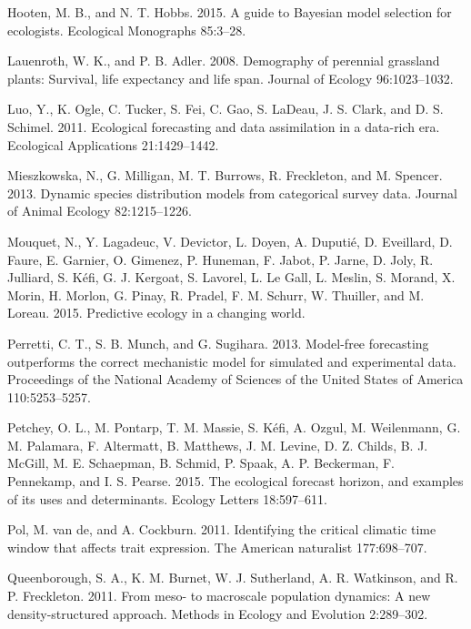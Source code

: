 \documentclass[12pt,]{article}
\begin{document}
\hypertarget{ref-Hooten2015}{}
Hooten, M. B., and N. T. Hobbs. 2015. A guide to Bayesian model
selection for ecologists. Ecological Monographs 85:3--28.

\hypertarget{ref-Lauenroth2008}{}
Lauenroth, W. K., and P. B. Adler. 2008. Demography of perennial
grassland plants: Survival, life expectancy and life span. Journal of
Ecology 96:1023--1032.

\hypertarget{ref-Luo2011a}{}
Luo, Y., K. Ogle, C. Tucker, S. Fei, C. Gao, S. LaDeau, J. S. Clark, and
D. S. Schimel. 2011. Ecological forecasting and data assimilation in a
data-rich era. Ecological Applications 21:1429--1442.

\hypertarget{ref-Mieszkowska2013}{}
Mieszkowska, N., G. Milligan, M. T. Burrows, R. Freckleton, and M.
Spencer. 2013. Dynamic species distribution models from categorical
survey data. Journal of Animal Ecology 82:1215--1226.

\hypertarget{ref-Mouquet2015}{}
Mouquet, N., Y. Lagadeuc, V. Devictor, L. Doyen, A. Duputié, D.
Eveillard, D. Faure, E. Garnier, O. Gimenez, P. Huneman, F. Jabot, P.
Jarne, D. Joly, R. Julliard, S. Kéfi, G. J. Kergoat, S. Lavorel, L. Le
Gall, L. Meslin, S. Morand, X. Morin, H. Morlon, G. Pinay, R. Pradel, F.
M. Schurr, W. Thuiller, and M. Loreau. 2015. Predictive ecology in a
changing world.

\hypertarget{ref-Perretti2013a}{}
Perretti, C. T., S. B. Munch, and G. Sugihara. 2013. Model-free
forecasting outperforms the correct mechanistic model for simulated and
experimental data. Proceedings of the National Academy of Sciences of
the United States of America 110:5253--5257.

\hypertarget{ref-Petchey2015}{}
Petchey, O. L., M. Pontarp, T. M. Massie, S. Kéfi, A. Ozgul, M.
Weilenmann, G. M. Palamara, F. Altermatt, B. Matthews, J. M. Levine, D.
Z. Childs, B. J. McGill, M. E. Schaepman, B. Schmid, P. Spaak, A. P.
Beckerman, F. Pennekamp, and I. S. Pearse. 2015. The ecological forecast
horizon, and examples of its uses and determinants. Ecology Letters
18:597--611.

\hypertarget{ref-VandePol2011}{}
Pol, M. van de, and A. Cockburn. 2011. Identifying the critical climatic
time window that affects trait expression. The American naturalist
177:698--707.

\hypertarget{ref-Queenborough2011}{}
Queenborough, S. A., K. M. Burnet, W. J. Sutherland, A. R. Watkinson,
and R. P. Freckleton. 2011. From meso- to macroscale population
dynamics: A new density-structured approach. Methods in Ecology and
Evolution 2:289--302.
\end{document}
